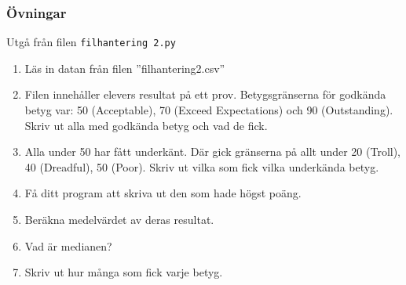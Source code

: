 \documentclass[aspectratio=169]{beamer}
\begin{document}
\begin{frame}
\frametitle{Övningar}

Utgå från filen \texttt{filhantering 2.py}

\begin{enumerate}
	\item Läs in datan från filen ''filhantering2.csv''
	\item Filen innehåller elevers resultat på ett prov. Betygsgränserna för godkända betyg var: 50 (Acceptable), 70 (Exceed Expectations) och 90 (Outstanding). Skriv ut alla med godkända betyg och vad de fick.
	\item Alla under 50 har fått underkänt. Där gick gränserna på allt under 20 (Troll), 40 (Dreadful), 50 (Poor). Skriv ut vilka som fick vilka underkända betyg.
	\item Få ditt program att skriva ut den som hade högst poäng.
	\item Beräkna medelvärdet av deras resultat.
	\item Vad är medianen?
	\item Skriv ut hur många som fick varje betyg.
\end{enumerate}

\end{frame}
\end{document}
